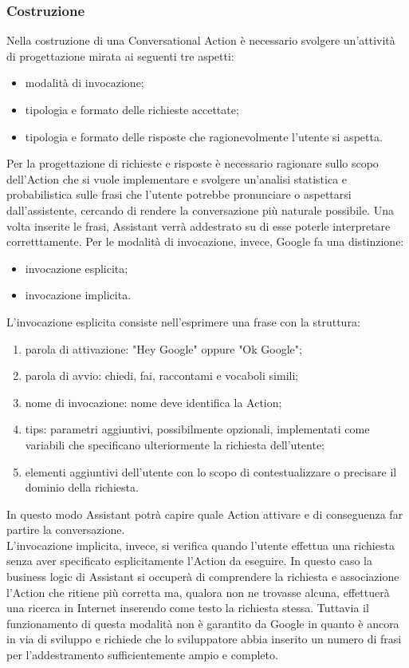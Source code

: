 		\subsubsection{Costruzione}
		Nella costruzione di una Conversational Action è necessario svolgere un'attività di progettazione mirata ai seguenti tre aspetti:
		\begin{itemize}
			\item modalità di invocazione;
			\item tipologia e formato delle richieste accettate;
			\item tipologia e formato delle risposte che ragionevolmente l'utente si aspetta.
		\end{itemize}
		Per la progettazione di richieste e risposte è necessario ragionare sullo scopo dell'Action che si vuole implementare e svolgere un'analisi statistica e probabilistica sulle frasi che l'utente potrebbe pronunciare o aspettarsi dall'assistente, cercando di rendere la conversazione più naturale possibile. Una volta inserite le frasi, Assistant verrà addestrato su di esse poterle interpretare corretttamente.
		Per le modalità di invocazione, invece, Google fa una distinzione:
		\begin{itemize}
			\item invocazione esplicita;
			\item invocazione implicita.
		\end{itemize}
		L'invocazione esplicita consiste nell'esprimere una frase con la struttura:
		\begin{enumerate}
			\item parola di attivazione: "Hey Google" oppure "Ok Google";
			\item parola di avvio: chiedi, fai, raccontami e vocaboli simili;
			\item nome di invocazione: nome deve identifica la Action;
			\item tips: parametri aggiuntivi, possibilmente opzionali, implementati come variabili che specificano ulteriormente la richiesta dell'utente;
			\item elementi aggiuntivi dell'utente con lo scopo di contestualizzare o precisare il dominio della richiesta.
		\end{enumerate}
		In questo modo Assistant potrà capire quale Action attivare e di conseguenza far partire la conversazione. \\
		L'invocazione implicita, invece, si verifica quando l'utente effettua una richiesta senza aver specificato esplicitamente l'Action da eseguire. In questo caso la business logic di Assistant si occuperà di comprendere la richiesta e associazione l'Action che ritiene più corretta ma, qualora non ne trovasse alcuna, effettuerà una ricerca in Internet inserendo come testo la richiesta stessa. Tuttavia il funzionamento di questa modalità non è garantito da Google in quanto è ancora in via di sviluppo e richiede che lo sviluppatore abbia inserito un numero di frasi per l'addestramento sufficientemente ampio e completo.
